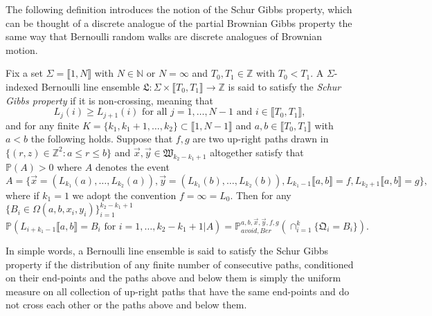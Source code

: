 The following definition introduces the notion of the Schur Gibbs property, which can be thought of a discrete analogue of the partial Brownian Gibbs property the same way that Bernoulli random walks are discrete analogues of Brownian motion. 
\begin{definition}\label{DefSGP}
Fix a set $\Sigma = \llbracket 1, N \rrbracket$ with $N \in \mathbb{N}$ or $N = \infty$ and $T_0, T_1\in \mathbb{Z}$ with $T_0 < T_1$. A $\Sigma$-indexed Bernoulli line ensemble $\mathfrak{L} : \Sigma \times \llbracket T_0, T_1 \rrbracket \rightarrow \mathbb{Z}$ is said to satisfy the {\em Schur Gibbs property} if it is non-crossing, meaning that 
$$ L_j(i) \geq L_{j+1}(i) \mbox{ for all $j = 1, \dots, N-1$ and $i \in \llbracket T_0, T_1 \rrbracket$},$$
and for any finite $K = \{k_1, k_1 + 1, \dots, k_2 \} \subset \llbracket 1, N - 1 \rrbracket$ and $a,b \in \llbracket T_0, T_1 \rrbracket$ with $a < b$ the following holds.  Suppose that $f, g$ are two up-right paths drawn in $\{ (r,z) \in \mathbb{Z}^2 : a \leq r \leq b\}$ and $\vec{x}, \vec{y} \in \mathfrak{W}_{k_2 - k_1 + 1}$ altogether satisfy that $\mathbb{P}(A) > 0$ where $A$ denotes the event $$A =\{ \vec{x} = ({L}_{k_1}(a), \dots, {L}_{k_2}(a)), \vec{y} = ({L}_{k_1}(b), \dots, {L}_{k_2}(b)), L_{k_1-1} \llbracket a,b \rrbracket = f, L_{k_2+1} \llbracket a,b \rrbracket = g \},$$
where if $k_1 = 1$ we adopt the convention $f = \infty = L_0$. Then for any $\{ B_i \in \Omega(a, b, x_i , y_i) \}_{i = 1}^{k_2 - k_1 +1}$ 
\begin{equation}\label{SchurEq}
\mathbb{P}\left( L_{i + k_1-1}\llbracket a,b \rrbracket = B_{i} \mbox{ for $i = 1, \dots, k_2 - k_1 + 1$} \vert  A \right) = \mathbb{P}_{avoid, Ber}^{a,b, \vec{x}, \vec{y}, f, g} \left( \cap_{i = 1}^k\{ \mathfrak{Q}_i = B_i \} \right).
\end{equation}
\end{definition}
\begin{remark}\label{RemSGB} In simple words, a Bernoulli line ensemble is said to satisfy the Schur Gibbs property if the distribution of any finite number of consecutive paths, conditioned on their end-points and the paths above and below them is simply the uniform measure on all collection of up-right paths that have the same end-points and do not cross each other or the paths above and below them. 
\end{remark}

